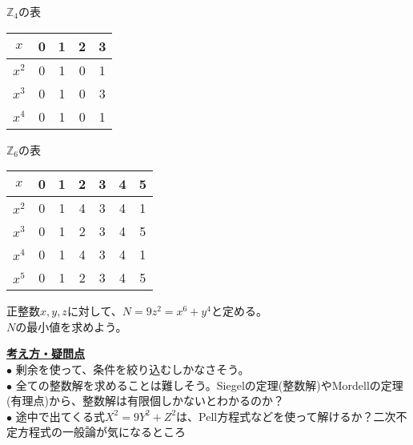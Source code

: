 \documentclass[11pt]{article}
\begin{document}
\begin{minipage}[t]{0.27\textwidth}
$\mathbb{Z}_4$の表\\
\begin{tabular}{|c|c|c|c|c|}
\hline
$x$ & 0 & 1 & 2 & 3\\
\hline
$x^2$ & 0 & 1 & 0 & 1\\
\hline
$x^3$ & 0 & 1 & 0 & 3\\
\hline
$x^4$ & 0 & 1 & 0 & 1\\
\hline
\end{tabular}
\end{minipage}
\hfill
\begin{minipage}[t]{0.27\textwidth}
$\mathbb{Z}_6$の表\\
\begin{tabular}{|c|c|c|c|c|c|c|}
\hline
$x$ & 0 & 1 & 2 & 3 & 4 & 5\\
\hline
$x^2$ & 0 & 1 & 4 & 3 & 4 & 1\\
\hline
$x^3$ & 0 & 1 & 2 & 3 & 4 & 5\\
\hline
$x^4$ & 0 & 1 & 4 & 3 & 4 & 1\\
\hline
$x^5$ & 0 & 1 & 2 & 3 & 4 & 5\\
\hline
\end{tabular}
\end{minipage}

\newpage

\begin{tcolorbox}[mybox={問２}]
正整数$x,y,z$に対して、$N=9z^2 = x^6 + y^4$と定める。\\
$N$の最小値を求めよう。
\end{tcolorbox}

\underline{\textbf{考え方・疑問点}}\\
$\bullet$ 剰余を使って、条件を絞り込むしかなさそう。\\
$\bullet$ 全ての整数解を求めることは難しそう。Siegelの定理(整数解)やMordellの定理(有理点)から、整数解は有限個しかないとわかるのか？\\
$\bullet$ 途中で出てくる式$X^2 = 9Y^2 + Z^2$は、Pell方程式などを使って解けるか？二次不定方程式の一般論が気になるところ\\
\end{document}
